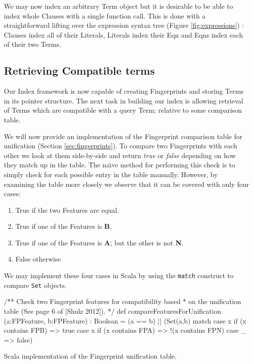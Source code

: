 We may now index an arbitrary Term object but it is desirable to be able to index
whole Clauses with a single function call. This is done with a straightforward lifting
over the expression syntax tree (Figure \ref{fig:expressions}) : Clauses index all of their Literals, Literals index
their Eqn and Eqns index each of their two Terms.

\subsection{Retrieving Compatible terms}

Our Index framework is now capable of creating Fingerprints and storing Terms in
its pointer structure. The next task in building our index is allowing retrieval
of Terms which are compatible with a query Term; relative to some comparison
table.

We will now provide an implementation of the Fingerprint comparison table for unification (Section \ref{sec:fingerprints}).
To compare two Fingerprints with each other we look at them side-by-side and return
\emph{true} or \emph{false} depending on how they match up in the table.
The na\"{\i}ve method for performing this check is to simply check for each possible
entry in the table manually. However, by examining the table more closely we observe
that it can be covered with only four cases:
\begin{enumerate}
\item True if the two Features are equal.
\item True if one of the Features is \textbf{B}.
\item True if one of the Features is \textbf{A}; but the other is not \textbf{N}.
\item False otherwise 
\end{enumerate}
We may implement these four cases in Scala by using the \verb!match! construct
to compare \verb!Set! objects.
\begin{listing}[H]
\begin{scalacode}
 /** Check two Fingerprint features for compatibility based
   * on the unification table (See page 6 of [Shulz 2012]). */
  def compareFeaturesForUnification
         (a:FPFeature, b:FPFeature) : Boolean =
  (a == b) || 
  (Set(a,b) match {
    case x if (x contains FPB) => true
    case x if (x contains FPA) => !(x contains FPN)
    case _ => false})
\end{scalacode}
\caption{Scala implementation of the Fingerprint unification table. \protect\cite[p6]{shulz12}}
\label{lst:unitable}
\end{listing}

